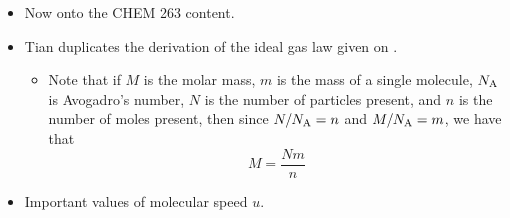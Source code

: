 \documentclass[../notes.tex]{subfiles}
\begin{document}
\begin{itemize}
\begin{itemize}
    \end{itemize}
    \item Now onto the CHEM 263 content.
    \item Tian duplicates the derivation of the ideal gas law given on \textcite[18-19]{bib:PHYS13300Notes}.
    \begin{itemize}
        \item Note that if $M$ is the molar mass, $m$ is the mass of a single molecule, $N_\text{A}$ is Avogadro's number, $N$ is the number of particles present, and $n$ is the number of moles present, then since $N/N_\text{A}=n$ and $M/N_\text{A}=m$, we have that
        \begin{equation*}
            M = \frac{Nm}{n}
        \end{equation*}
    \end{itemize}
    \item Important values of molecular speed $u$.
    \begin{figure}[H]
        \centering
\end{figure}
\end{itemize}
\end{document}
